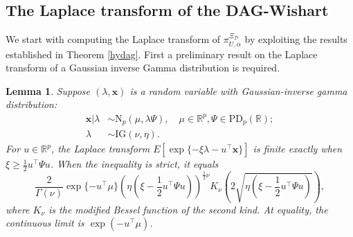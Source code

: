 \documentclass[12pt]{article}
\newcommand{\R}{\mathbb{R}}
\newcommand{\D}{\mathcal{D}}
\theoremstyle{plain}
\newtheorem{lemma}[theorem]{Lemma}
\theoremstyle{definition}
\theoremstyle{remark}
\begin{document}
\subsection*{ The Laplace transform of the DAG-Wishart} We start with computing the Laplace transform of  $\pi^{\Xi_{\D}}_{U,\alpha}$ by exploiting the results established in Theorem \ref{hydag}. First a preliminary result on the Laplace transform of a Gaussian inverse Gamma distribution is required.
\begin{lemma}\label{lem:laplace_t_normal-inv-gamma}
Suppose $(\lambda, \mathbf{x})$ is a random variable with Gaussian-inverse gamma distribution:
\begin{align*}
\mathbf{x}|\lambda&\sim \mathrm{N}_{p}(\mu, \lambda \Psi) ,\quad \mu\in \R^{p}, \Psi\in \mathrm{PD}_{p}(\R);\\
\lambda&\sim \mathrm{IG}(\nu, \eta).
\end{align*}
For \(u\in\R^p\), the Laplace transform
\(E[\exp\{-\xi\lambda-u^\top\mathbf{x}\}]\) is finite exactly when
\(\xi\geq\tfrac12u^\top\Psi u\).  When the inequality is strict, it equals
\[
\frac{2}{\Gamma(\nu)}\exp\{-u^{\top}\mu\}\left(\eta(\xi-\frac{1}{2}u^{\top}\Psi u)\right)^{\frac{1}{2}\nu} K_{\nu}\left(2\sqrt{\eta(\xi-\frac{1}{2}u^{\top}\Psi u)}\right),
\]
where \(K_{\nu}\) is the modified Bessel function of the second kind.
At equality, the continuous limit is \(\exp(-u^\top\mu)\).
\end{lemma}
\end{document}
